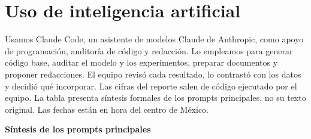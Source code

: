 \documentclass[10pt,letterpaper]{article}
\begin{document}
\section{Uso de inteligencia artificial}
Usamos Claude Code, un asistente de modelos Claude de Anthropic, como apoyo de programación, auditoría de código y redacción. Lo empleamos para generar código base, auditar el modelo y los experimentos, preparar documentos y proponer redacciones. El equipo revisó cada resultado, lo contrastó con los datos y decidió qué incorporar. Las cifras del reporte salen de código ejecutado por el equipo. La tabla presenta síntesis formales de los prompts principales, no su texto original. Las fechas están en hora del centro de México.

\small
\begin{center}\textbf{Síntesis de los prompts principales}\end{center}
\vspace{-4pt}
\end{document}
